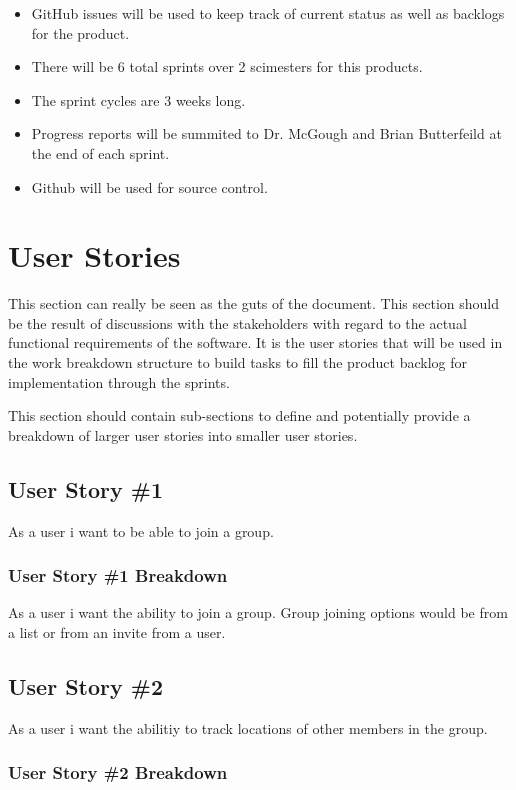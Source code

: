 \begin{itemize}
\item GitHub issues will be used to keep track of current status as well as backlogs for the product.
\item There will be 6 total sprints over 2 scimesters for this products.
\item The sprint cycles are 3 weeks long.
\item Progress reports will be summited to Dr. McGough and Brian Butterfeild at the end of each sprint.
\item Github will be used for source control. 
\end{itemize}

\section{User Stories}
This section can really be seen as the guts of the document.  This section should 
be the result of discussions with the stakeholders with regard to the actual functional 
requirements of the software.  It is the user stories that will be used in the 
work breakdown structure to build tasks to fill the product backlog for implementation 
through the sprints.

This section should contain sub-sections to define and potentially provide a breakdown 
of larger user stories into smaller user stories. 



\subsection{User Story \#1 }
As a user i want to be able to join a group.

\subsubsection{User Story \#1 Breakdown}
As a user i want the ability to join a group. Group joining options would be from a list or from an invite from a user. 

\subsection{User Story \#2} 
As a user i want the abilitiy to track locations of other members in the group.

\subsubsection{User Story \#2 Breakdown}


